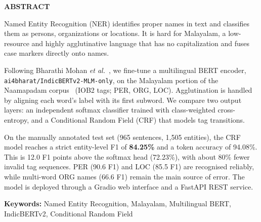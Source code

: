 \documentclass[12pt,a4wide]{report}
\theoremstyle{plain}
\theoremstyle{definition}
\theoremstyle{remark}
\begin{document}
\clearpage
{} \setcounter{page}{2}

\begin{center}
{\Large{\bf{ABSTRACT}}}
\end{center}

Named Entity Recognition (NER) identifies proper names in text and
classifies them as persons, organizations or locations. It is hard for
Malayalam, a low-resource and highly agglutinative language that has no
capitalization and fuses case markers directly onto names.

Following Bharathi Mohan \emph{et al.}~\cite{mohan2023finetuned}, we fine-tune
a multilingual BERT encoder, \texttt{ai4bharat/IndicBERTv2-MLM-only}, on the
Malayalam portion of the Naamapadam corpus~\cite{mhaske2023naamapadam}
(IOB2 tags; PER, ORG, LOC). Agglutination is handled by aligning each word's
label with its first subword. We compare two output layers: an independent
softmax classifier trained with class-weighted cross-entropy, and a
Conditional Random Field (CRF) that models tag transitions.

On the manually annotated test set (965 sentences, 1{,}505 entities), the
CRF model reaches a strict entity-level F1 of \textbf{84.25\%} and a token
accuracy of 94.08\%. This is 12.0 F1 points above the softmax head (72.23\%),
with about 80\% fewer invalid tag sequences. PER (90.6 F1) and LOC (85.5 F1)
are recognised reliably, while multi-word ORG names (66.6 F1) remain the main
source of error. The model is deployed through a Gradio web interface and a
FastAPI REST service.

\vspace{0.5cm}
\noindent\textbf{Keywords:} Named Entity Recognition, Malayalam, Multilingual
BERT, IndicBERTv2, Conditional Random Field

\clearpage

\tableofcontents

\newpage

\setcounter{page}{1}














\end{document}
